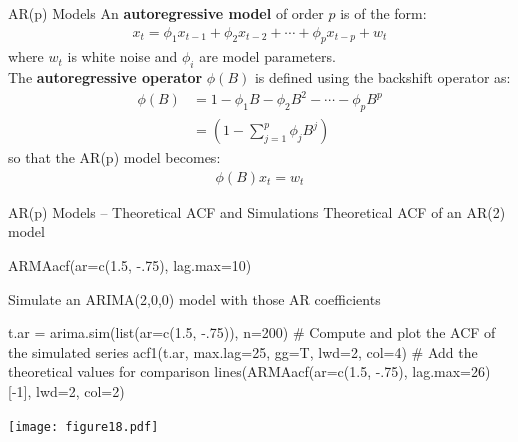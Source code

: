 \documentclass[ignorenonframetext,xcolor=x11names]{beamer}
\begin{document}
\begin{frame}{AR(p) Models}
An \textbf{autoregressive model} of order $p$ is of the form:
\begin{align*}
x_t = \phi_1 x_{t-1} + \phi_2 x_{t-2} + \cdots + \phi_p x_{t-p} + w_t
\end{align*}
where $w_t$ is white noise and $\phi_i$ are model parameters. \\



The \textbf{autoregressive operator} $\phi(B)$ is defined using the backshift operator as: 
\begin{align*}
\phi (B) &= 1 - \phi_1 B - \phi_2 B^2 - \cdots - \phi_p B^p \\
         &= \left(1 - \sum_{j=1}^p \phi_j B^j \right)
\end{align*}
so that the AR(p) model becomes:
\begin{align*}
\phi (B) x_t = w_t
\end{align*}
\end{frame}


\begin{frame}[fragile]{AR(p) Models -- Theoretical ACF and Simulations}
Theoretical ACF of an AR(2) model
\begin{Rcode}
ARMAacf(ar=c(1.5, -.75), lag.max=10)
\end{Rcode}
Simulate an ARIMA(2,0,0) model with those AR coefficients
\begin{Rcode}
t.ar = arima.sim(list(ar=c(1.5, -.75)), n=200)
# Compute and plot the ACF of the simulated series
acf1(t.ar, max.lag=25, gg=T, lwd=2, col=4)
# Add the theoretical values for comparison
lines(ARMAacf(ar=c(1.5, -.75), lag.max=26)[-1], lwd=2, col=2)
\end{Rcode}
\begin{center}
\texttt{[image: figure18.pdf]}
\end{center}
\end{frame}
\end{document}
